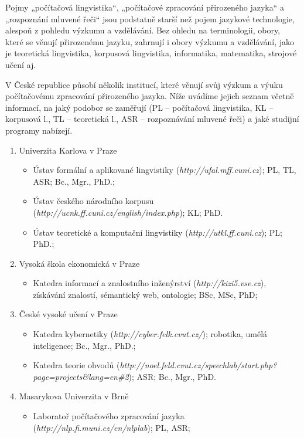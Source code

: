 \documentclass[]{../../metanetpaper}
\begin{document}
\begin{multicols}{2}
Pojmy „počítačová lingvistika“, „počítačové zpracování přirozeného jazyka“ a „rozpoznání mluvené řeči“ jsou podstatně starší než pojem jazykové technologie, alespoň z pohledu výzkumu a vzdělávání. Bez ohledu na terminologii, obory, které se věnují přirozenému jazyku, zahrnují i obory výzkumu a vzdělávání, jako je teoretická lingvistika, korpusová lingvistika, informatika, matematika, strojové učení aj.

V České republice působí několik institucí, které věnují svůj výzkum a výuku počítačovému zpracování přirozeného jazyka. Níže uvádíme jejich seznam včetně informací, na jaký podobor se zaměřují (PL – počítačová lingvistika, KL – korpusová l., TL – teoretická l., ASR – rozpoznávání mluvené řeči) a jaké studijní programy nabízejí.

\begin{enumerate}
\item Univerzita Karlova v Praze
  \begin{itemize}
  \item Ústav formální a aplikované lingvistiky (\textit{http://ufal.mff.cuni.cz}); PL, TL, ASR; Bc., Mgr., PhD.;
  \item Ústav českého národního korpusu (\textit{http://ucnk.ff.cuni.cz/english/index.php}); KL; PhD.
  \item Ústav teoretické a komputační lingvistiky (\textit{http://utkl.ff.cuni.cz}); PL; PhD.;
  \end{itemize}
\item Vysoká škola ekonomická v Praze
  \begin{itemize}
  \item Katedra informací a znalostního inženýrství (\textit{http://kizi5.vse.cz}), získávání znalostí, sémantický web, ontologie; BSc, MSc, PhD;
  \end{itemize}
\item České vysoké učení v Praze
  \begin{itemize}
  \item Katedra kybernetiky (\textit{http://cyber.felk.cvut.cz/}); robotika, umělá inteligence; Bc., Mgr., PhD.;
  \item Katedra teorie obvodů (\textit{http://noel.feld.cvut.cz/speechlab/start.php?page=projects\&lang=en\#2});  ASR; Bc., Mgr., PhD.
  \end{itemize}
\item Masarykova Univerzita v Brně
  \begin{itemize}
  \item Laboratoř počítačového zpracování jazyka (\textit{http://nlp.fi.muni.cz/en/nlplab}); PL, ASR; 

\end{itemize}
\end{enumerate}
\end{multicols}
\end{document}
